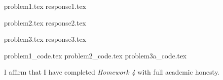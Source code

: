 \documentclass[letterpaper, 12pt]{article}
\begin{document}

{problem1.tex}
{response1.tex}

{problem2.tex}
{response2.tex}

{problem3.tex}
{response3.tex}

\appendix

{problem1_code.tex}
{problem2_code.tex}
{problem3a_code.tex}

\par

I affirm that I have completed \textit{Homework 4} with full academic honesty.
\end{document}

